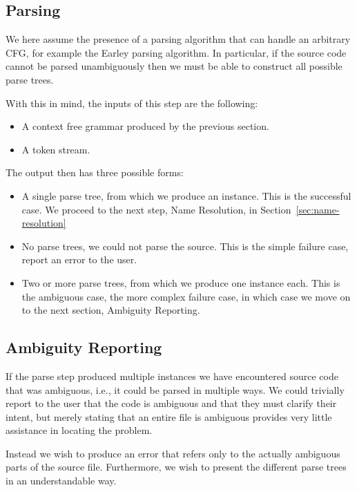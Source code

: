 \documentclass{kththesis}
\begin{document}
\subsection{Parsing}

We here assume the presence of a parsing algorithm that can handle an arbitrary CFG, for example the Earley \cite{Earley1970An-Efficient-Co} parsing algorithm. In particular, if the source code cannot be parsed unambiguously then we must be able to construct all possible parse trees.

With this in mind, the inputs of this step are the following:

\begin{itemize}
  \item A context free grammar produced by the previous section.
  \item A token stream.
\end{itemize}

The output then has three possible forms:

\begin{itemize}
  \item A single parse tree, from which we produce an instance. This is the successful case. We proceed to the next step, Name Resolution, in Section~\ref{sec:name-resolution}
  \item No parse trees, we could not parse the source. This is the simple failure case, report an error to the user.
  \item Two or more parse trees, from which we produce one instance each. This is the ambiguous case, the more complex failure case, in which case we move on to the next section, Ambiguity Reporting.
\end{itemize}

\subsection{Ambiguity Reporting} \label{sec:implementation-ambiguity-detection}

If the parse step produced multiple instances we have encountered source code that was ambiguous, i.e., it could be parsed in multiple ways. We could trivially report to the user that the code is ambiguous and that they must clarify their intent, but merely stating that an entire file is ambiguous provides very little assistance in locating the problem.

Instead we wish to produce an error that refers only to the actually ambiguous parts of the source file. Furthermore, we wish to present the different parse trees in an understandable way.
\end{document}
